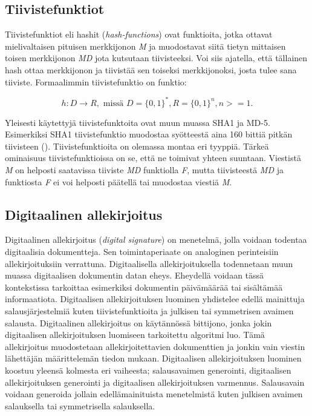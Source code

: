  \subsection{Tiivistefunktiot}
 Tiivistefunktiot eli hashit (\emph{hash-functions}) ovat funktioita, jotka ottavat mielivaltaisen pituisen merkkijonon \emph{M} ja muodostavat siitä tietyn mittaisen toisen merkkijonon \emph{MD} jota kutsutaan tiivisteeksi. Voi siis ajatella, että tällainen hash ottaa merkkijonon ja tiivistää sen toiseksi merkkijonoksi, josta tulee sana tiiviste. Formaalimmin tiivistefunktio on funktio:
 
 \[h: D \to R, \text{ missä } D = \big\{0,1\big\}^{*}, R = \big\{0,1\big\}^{n}, n >= 1.\]
 
 Yleisesti käytettyjä tiivistefunktoita ovat muun muassa SHA1 ja MD-5. Esimerkiksi SHA1 tiivistefunktio muodostaa syötteestä aina 160 bittiä pitkän tiivisteen (\cite{bellare2005introduction}). Tiivistefunktioita on olemassa montaa eri tyyppiä. Tärkeä ominaisuus tiivistefunktioissa on se, että ne toimivat yhteen suuntaan. Viestistä \emph{M} on helposti saatavissa tiiviste \emph{MD} funktiolla \emph{F}, mutta tiivisteestä \emph{MD} ja funktiosta \emph{F} ei voi helposti päätellä tai muodostaa viestiä \emph{M}.
 
 \subsection{Digitaalinen allekirjoitus}
 Digitaalinen allekirjoitus (\emph{digital signature}) on menetelmä, jolla voidaan todentaa digitaalisia dokumentteja. Sen toimintaperiaate on analoginen perinteisiin allekirjoituksiin verrattuna. Digitaalisella allekirjoituksella todennetaan muun muassa digitaalisen dokumentin datan eheys. Eheydellä voidaan tässä kontekstissa tarkoittaa esimerkiksi dokumentin päivämäärää tai sisältämää informaatiota. Digitaalisen allekirjoituksen luominen yhdistelee edellä mainittuja salausjärjestelmiä kuten tiivistefunktioita ja julkisen tai symmetrisen avaimen salausta. Digitaalinen allekirjoitus on käytännössä bittijono, jonka jokin digitaalisen allekirjoituksen luomiseen tarkoitettu algoritmi luo. Tämä allekirjoitus muodostetaan allekirjoitettavien dokumenttien ja jonkin vain viestin lähettäjän määrittelemän tiedon mukaan. Digitaalisen allekirjoituksen luominen koostuu yleensä kolmesta eri vaiheesta; salausavaimen generointi, digitaalisen allekirjoituksen generointi ja digitaalisen allekirjoituksen varmennus. Salausavain voidaan generoida jollain edellämainituista menetelmistä kuten julkisen avaimen salauksella tai symmetrisella salauksella.

